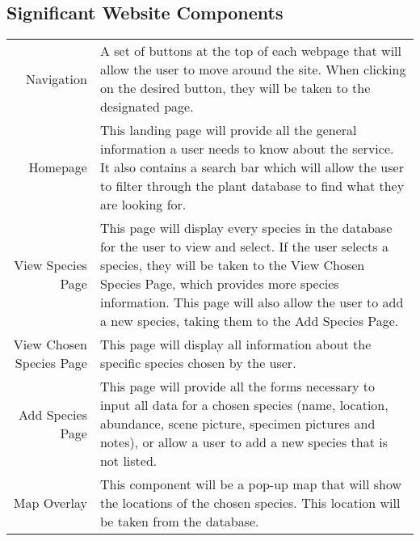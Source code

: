 \subsection{Significant Website Components}
	\begin{tabular}{r p{10cm}}
	Navigation & A set of buttons at the top of each webpage that will allow the user to move around the site. When clicking on the desired button, they will be taken to the designated page.\\

	Homepage & This landing page will provide all the general information a user needs to know about the service. It also contains a search bar which will allow the user to filter through the plant database to find what they are looking for. \\

	View Species Page & This page will display every species in the database for the user to view and select. If the user selects a species, they will be taken to the View Chosen Species Page, which provides more species information. This page will also allow the user to add a new species, taking them to the Add Species Page. \\

	View Chosen Species Page & This page will display all information about the specific species chosen by the user. \\

	Add Species Page & This page will provide all the forms necessary to input all data for a chosen species (name, location, abundance, scene picture, specimen pictures and notes), or allow a user to add a new species that is not listed. \\

	Map Overlay & This component will be a pop-up map that will show the locations of the chosen species. This location will be taken from the database.\\
	\end{tabular}

